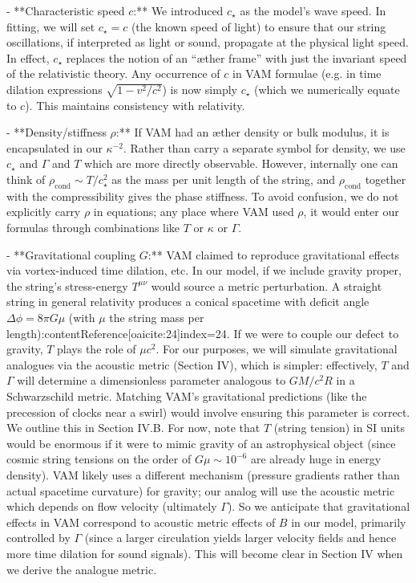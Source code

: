\documentclass[12pt]{article}
\begin{document}
- **Characteristic speed $c$:** We introduced $c_\star$ as the model’s wave speed. In fitting, we will set $c_\star = c$ (the known speed of light) to ensure that our string oscillations, if interpreted as light or sound, propagate at the physical light speed. In effect, $c_\star$ replaces the notion of an “æther frame” with just the invariant speed of the relativistic theory. Any occurrence of $c$ in VAM formulae (e.g. in time dilation expressions $\sqrt{1-v^2/c^2}$) is now simply $c_\star$ (which we numerically equate to $c$). This maintains consistency with relativity.

- **Density/stiffness $\rho$:** If VAM had an æther density or bulk modulus, it is encapsulated in our $\kappa^{-2}$. Rather than carry a separate symbol for density, we use $c_\star$ and $\Gamma$ and $T$ which are more directly observable. However, internally one can think of $\rho_{\text{cond}} \sim T/c_\star^2$ as the mass per unit length of the string, and $\rho_{\text{cond}}$ together with the compressibility gives the phase stiffness. To avoid confusion, we do not explicitly carry $\rho$ in equations; any place where VAM used $\rho$, it would enter our formulas through combinations like $T$ or $\kappa$ or $\Gamma$. 

- **Gravitational coupling $G$:** VAM claimed to reproduce gravitational effects via vortex-induced time dilation, etc. In our model, if we include gravity proper, the string’s stress-energy $T^{\mu\nu}$ would source a metric perturbation. A straight string in general relativity produces a conical spacetime with deficit angle $ \Delta \phi = 8\pi G \mu$ (with $\mu$ the string mass per length):contentReference[oaicite:24]{index=24}. If we were to couple our defect to gravity, $T$ plays the role of $\mu c^2$. For our purposes, we will simulate gravitational analogues via the acoustic metric (Section IV), which is simpler: effectively, $T$ and $\Gamma$ will determine a dimensionless parameter analogous to $GM/c^2R$ in a Schwarzschild metric. Matching VAM’s gravitational predictions (like the precession of clocks near a swirl) would involve ensuring this parameter is correct. We outline this in Section IV.B. For now, note that $T$ (string tension) in SI units would be enormous if it were to mimic gravity of an astrophysical object (since cosmic string tensions on the order of $G\mu \sim 10^{-6}$ are already huge in energy density). VAM likely uses a different mechanism (pressure gradients rather than actual spacetime curvature) for gravity; our analog will use the acoustic metric which depends on flow velocity (ultimately $\Gamma$). So we anticipate that gravitational effects in VAM correspond to acoustic metric effects of $B$ in our model, primarily controlled by $\Gamma$ (since a larger circulation yields larger velocity fields and hence more time dilation for sound signals). This will become clear in Section IV when we derive the analogue metric. 
\end{document}
